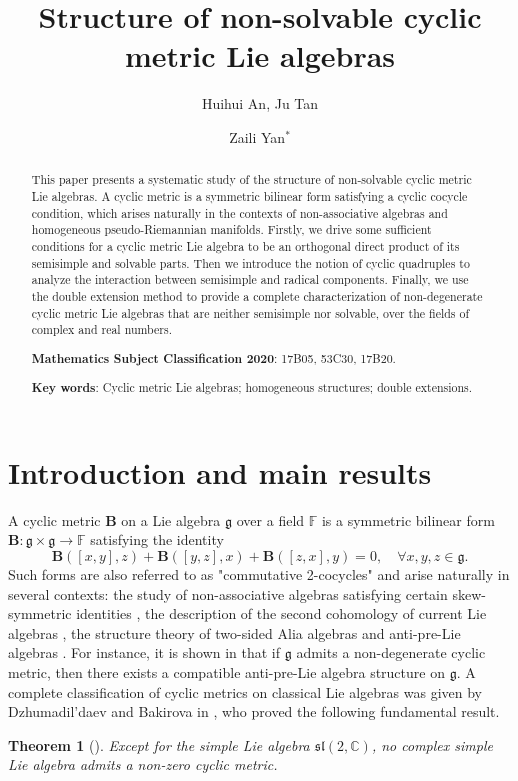 \documentclass[reqno]{amsart}
\title{Structure of non-solvable cyclic metric Lie algebras}
\author{Huihui An, Ju Tan \and Zaili Yan$^{*}$}
\date{}
\newtheorem{thm}{Theorem}[section]
\theoremstyle{definition}
\begin{document}
\begin{abstract}
This paper presents a systematic study of the structure of non-solvable cyclic metric Lie algebras.
 A cyclic metric is a symmetric bilinear form satisfying a cyclic cocycle condition, which arises naturally in the contexts of  non-associative algebras  and homogeneous pseudo-Riemannian manifolds. Firstly,
we drive some sufficient conditions for a cyclic metric Lie algebra to be an orthogonal direct product of its semisimple and solvable parts. Then we introduce the notion of cyclic quadruples to analyze the interaction between semisimple and radical components. Finally, we use the double extension method to provide a complete characterization of non-degenerate cyclic metric Lie algebras that are neither semisimple nor solvable, over the fields of complex and real numbers.

\medskip
\textbf{Mathematics Subject Classification 2020}:   17B05, 53C30,  17B20.

\medskip
\textbf{Key words}: Cyclic metric Lie algebras; homogeneous structures;   double extensions.

\end{abstract}
\maketitle
\section{Introduction and main results}
A cyclic metric $\mathbf{B}$ on a Lie algebra $\mathfrak{g}$ over a field $\mathbb{F}$ is a symmetric bilinear form $\mathbf{B}: \mathfrak{g}\times \mathfrak{g}\rightarrow \mathbb{F}$ satisfying the identity
 \begin{equation*}
 \mathbf{B}([x,y],z)+\mathbf{B}([y,z],x)+\mathbf{B}([z,x],y)=0, \quad \forall x,y,z\in\mathfrak{g}.
 \end{equation*}
Such forms are also referred to as "commutative 2-cocycles" \cite{Dzhum10}  and arise naturally in several contexts: the study of non-associative algebras satisfying certain skew-symmetric identities \cite{Dzhum09}, the description of the second cohomology of current Lie algebras \cite{zusman94},  the structure theory of two-sided Alia algebras \cite{DB09} and anti-pre-Lie algebras \cite{LB22,LB24}.
For instance, it is shown in \cite[Theorem 2.19]{LB22} that
if $\mathfrak{g}$  admits a non-degenerate cyclic metric,  then there exists a compatible anti-pre-Lie algebra structure on $\mathfrak{g}$.
A complete classification of cyclic metrics on classical Lie algebras was given by Dzhumadil'daev and Bakirova in \cite{DB09},  who proved the following fundamental result.
\begin{thm}[\cite{DB09}]\label{1-thm-main1}
Except for the simple Lie algebra $\mathfrak{sl}(2,\mathbb{C})$,
no complex simple Lie algebra admits a non-zero cyclic metric.
\end{thm}
\end{document}
